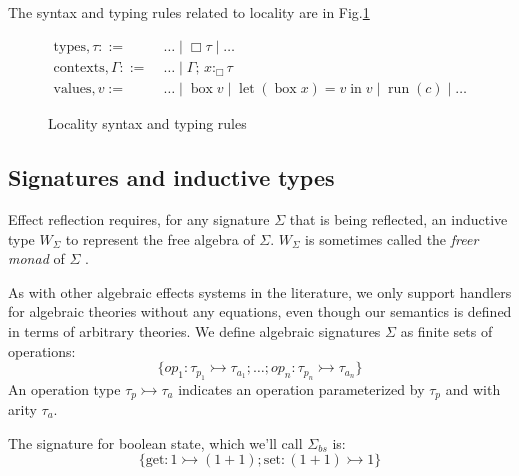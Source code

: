 \documentclass[acmsmall, screen, nonacm]{acmart}
\theoremstyle{definition}
\newcommand{\glob}{\mathop{\Box}}
\newcommand{\ind}[1]{W_{#1}}
\newcommand{\types}{\mathrel{:}}
\newcommand{\gtypes}{\mathrel{:_{\Box}}}
\newcommand{\ccons}[2]{#1;\,#2}
\newcommand{\gbind}[3]{\ccons{#1}{#2\gtypes#3}}
\newcommand{\cdiv}[1]{#1/\Box}
\newcommand{\gbox}[1]{\mathop{\mathrm{box}} #1}
\newcommand{\gunbox}[3]{\mathop{\mathrm{let}} (\gbox #1) = #2 \mathop{\mathrm{in}} #3}
\newcommand{\grun}[1]{\mathop{\mathrm{run}}(#1)}
\newcommand{\turnv}{\mathrel{\vdash_V}}
\newcommand{\turnc}{\mathrel{\vdash_C}}
\begin{document}
The syntax and typing rules related to locality are in
Fig.\ref{fig:typing-locality}
\begin{figure}
\begin{align*}
  \mathrm{types}, \tau ::=\;& \ldots \mid \glob \tau \mid \ldots \\
  \mathrm{contexts}, \Gamma ::=\;& \ldots \mid \gbind{\Gamma}{x}{\tau} \\
  \mathrm{values}, v :=\;& \ldots \mid \gbox{v} \mid \gunbox{x}{v}{v}
                           \mid \grun{c} \mid \ldots
\end{align*}
\caption{Locality syntax and typing rules}
\label{fig:typing-locality}
\end{figure}

\subsection{Signatures and inductive types}

Effect reflection requires, for any signature $\Sigma$ that is being
reflected, an inductive type $\ind{\Sigma}$ to represent the free
algebra of $\Sigma$. $\ind{\Sigma}$ is sometimes called the \emph{freer
  monad} of $\Sigma$ \cite{kiselyov2015freer}.

As with other algebraic effects systems in the literature, we only
support handlers for algebraic theories without any equations, even
though our semantics is defined in terms of arbitrary theories. We
define algebraic signatures $\Sigma$ as finite sets of operations:
\begin{equation*}
\{ op_1 \types \tau_{p_1} \rightarrowtail \tau_{a_1}; \ldots; op_n
\types \tau_{p_n} \rightarrowtail \tau_{a_n} \}
\end{equation*}
An operation type $\tau_p \rightarrowtail \tau_a$ indicates an operation
parameterized by $\tau_p$ and with arity $\tau_a$.

\begin{example}
  The signature for boolean state, which we'll call $\Sigma_{bs}$
  is:
  \begin{equation*}
    \{ \mathrm{get} \types 1 \rightarrowtail (1 + 1);
       \mathrm{set} \types (1 + 1) \rightarrowtail 1 \}
  \end{equation*}
\end{example}
\end{document}
